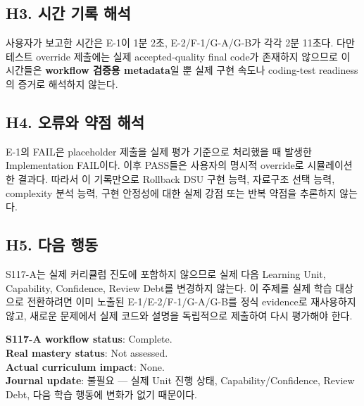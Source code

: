 \subsection{H3. 시간 기록 해석}
사용자가 보고한 시간은 E-1이 1분 2초, E-2/F-1/G-A/G-B가 각각 2분 11초다. 다만 테스트 override 제출에는 실제 accepted-quality final code가 존재하지 않으므로 이 시간들은 \textbf{workflow 검증용 metadata}일 뿐 실제 구현 속도나 coding-test readiness의 증거로 해석하지 않는다.

\subsection{H4. 오류와 약점 해석}
E-1의 FAIL은 placeholder 제출을 실제 평가 기준으로 처리했을 때 발생한 Implementation FAIL이다. 이후 PASS들은 사용자의 명시적 override로 시뮬레이션한 결과다. 따라서 이 기록만으로 Rollback DSU 구현 능력, 자료구조 선택 능력, complexity 분석 능력, 구현 안정성에 대한 실제 강점 또는 반복 약점을 추론하지 않는다.

\subsection{H5. 다음 행동}
S117-A는 실제 커리큘럼 진도에 포함하지 않으므로 실제 다음 Learning Unit, Capability, Confidence, Review Debt를 변경하지 않는다. 이 주제를 실제 학습 대상으로 전환하려면 이미 노출된 E-1/E-2/F-1/G-A/G-B를 정식 evidence로 재사용하지 않고, 새로운 문제에서 실제 코드와 설명을 독립적으로 제출하여 다시 평가해야 한다.

\begin{notebox}[최종 상태]
\textbf{S117-A workflow status}: Complete.\\
\textbf{Real mastery status}: Not assessed.\\
\textbf{Actual curriculum impact}: None.\\
\textbf{Journal update}: 불필요 --- 실제 Unit 진행 상태, Capability/Confidence, Review Debt, 다음 학습 행동에 변화가 없기 때문이다.
\end{notebox}
